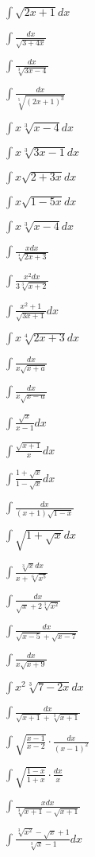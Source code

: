 \begin{multicols}{2}
$\displaystyle \int \sqrt{2x+1}dx$

$\displaystyle \int \frac{dx}{\sqrt{3+4x}}$

$\displaystyle \int \frac{dx}{\sqrt[3]{3x-4}}$

$\displaystyle \int \frac{dx}{\sqrt[5]{(2x+1)^3}}$

$\displaystyle \int x\sqrt[3]{x-4}dx$

$\displaystyle \int x\sqrt[3]{3x-1}dx$

$\displaystyle \int x\sqrt{2+3x}dx$

$\displaystyle \int x\sqrt{1-5x}dx$

$\displaystyle \int x\sqrt[3]{x-4}dx$

$\displaystyle \int \frac{xdx}{\sqrt[4]{2x+3}}$

$\displaystyle \int \frac{x^2dx}{3\sqrt[3]{x+2}}$

$\displaystyle \int \frac{x^2+1}{\sqrt{3x+1}}dx$

$\displaystyle \int x\sqrt[4]{2x+3}dx$

$\displaystyle \int \frac{dx}{x\sqrt{x+a}}$

$\displaystyle \int \frac{dx}{x\sqrt{x-a}}$

$\displaystyle \int \frac{\sqrt{x}}{x-1}dx$

$\displaystyle \int \frac{\sqrt{x+1}}{x}dx$

$\displaystyle \int \frac{1+\sqrt{x}}{1-\sqrt{x}}dx$

$\displaystyle \int \frac{dx}{(x+1)\sqrt{1-x}}$

$\displaystyle \int \sqrt{1+\sqrt{x}}dx$

$\displaystyle \int \frac{\sqrt[3]{x}dx}{x+\sqrt[6]{x^5}}$

$\displaystyle \int \frac{dx}{\sqrt{x}+2\sqrt[3]{x^2}}$

$\displaystyle \int \frac{dx}{\sqrt{x-5}+\sqrt{x-7}}$

$\displaystyle \int \frac{dx}{x\sqrt{x+9}}$

$\displaystyle \int x^2\sqrt[3]{7-2x}dx$

$\displaystyle \int \frac{dx}{\sqrt{x+1}+\sqrt[3]{x+1}}$

$\displaystyle \int \sqrt{\frac{x-1}{x-2}} \cdot \frac{dx}{(x-1)^2}$

$\displaystyle \int \sqrt{\frac{1-x}{1+x}}\cdot\frac{dx}{x}$

$\displaystyle \int \frac{xdx}{\sqrt[3]{x+1}-\sqrt{x+1}}$

$\displaystyle \int \frac{\sqrt[3]{x^2}-\sqrt{x}+1}{\sqrt[3]{x}-1}dx$
\end{multicols}

